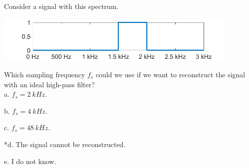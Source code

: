 
Consider a signal with this spectrum.

\includegraphics[width=4.60233in,height=0.88285in]{../../Images/SamplingAndAliasingQ4.png}

Which sampling frequency \(f_{s}\) could we use if we want to reconstruct the signal with an ideal high-pass filter? \\

a. \(f_{s} = 2\ kHz\).


b. \(f_{s} = 4\ kHz\).


c. \(f_{s} = 48\ kHz\).


*d. The signal cannot be reconstructed.


e. I do not know. \\

